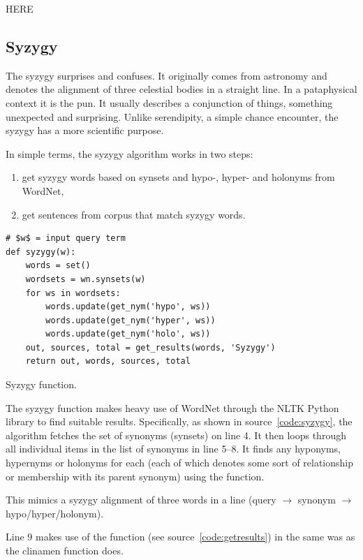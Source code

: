 HERE

\subsection{Syzygy}

The syzygy surprises and confuses. It originally comes from astronomy and denotes the alignment of three celestial bodies in a straight line. In a pataphysical context it is the pun. It usually describes a conjunction of things, something unexpected and surprising. Unlike serendipity, a simple chance encounter, the syzygy has a more scientific purpose.

In simple terms, the syzygy algorithm works in two steps:
\begin{enumerate}
  \item get syzygy words based on synsets and hypo-, hyper- and holonyms from WordNet,
  \item get sentences from corpus that match syzygy words.
\end{enumerate}

\begin{listing}
  \begin{verbatim}
# $w$ = input query term
def syzygy(w):
    words = set()
    wordsets = wn.synsets(w)
    for ws in wordsets:
        words.update(get_nym('hypo', ws))
        words.update(get_nym('hyper', ws))
        words.update(get_nym('holo', ws))
    out, sources, total = get_results(words, 'Syzygy')
    return out, words, sources, total
  \end{verbatim}
\caption{Syzygy function.}
\label{code:syzygy}
\end{listing}

The syzygy function makes heavy use of WordNet \parencite{Miller1995} through the \ac{NLTK} Python library to find suitable results. Specifically, as shown in source~\ref{code:syzygy}, the algorithm fetches the set of synonyms (synsets) on line 4. It then loops through all individual items  in the list of synonyms  in line 5--8. It finds any hyponyms, hypernyms or holonyms for each  (each of which denotes some sort of relationship or membership with its parent synonym) using the  function.

This mimics a syzygy alignment of three words in a line (query $\to$ synonym $\to$ hypo/hyper/holonym).

Line \num{9} makes use of the  function (see source~\ref{code:getresults}) in the same was as the clinamen function does.

